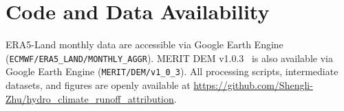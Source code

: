\documentclass[11pt]{article}
\begin{document}
\section{Code and Data Availability}

ERA5-Land monthly data are accessible via Google Earth Engine (\texttt{ECMWF/\allowbreak ERA5\_\allowbreak LAND/\allowbreak MONTHLY\_\allowbreak AGGR}). MERIT DEM v1.0.3~\cite{yamazaki2017merit} is also available via Google Earth Engine (\texttt{MERIT/\allowbreak DEM/\allowbreak v1\_0\_3}). All processing scripts, intermediate datasets, and figures are openly available at \url{https://github.com/Shengli-Zhu/hydro_climate_runoff_attribution}.



\end{document}
